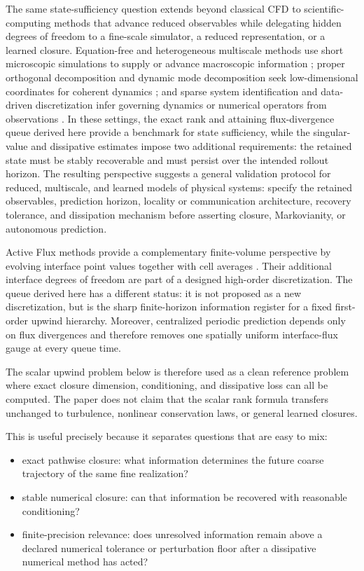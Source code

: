 \documentclass[preprint,12pt]{elsarticle}
\theoremstyle{plain}
\theoremstyle{remark}
\theoremstyle{definition}
\begin{document}
The same state-sufficiency question extends beyond classical CFD to scientific-computing
methods that advance reduced observables while delegating hidden degrees of freedom to a
fine-scale simulator, a reduced representation, or a learned closure. Equation-free and
heterogeneous multiscale methods use short microscopic simulations to supply or advance
macroscopic information \cite{kevrekidis2003,eengquist2003}; proper orthogonal
decomposition and dynamic mode decomposition seek low-dimensional coordinates for
coherent dynamics \cite{sirovich1987,schmid2010}; and sparse system identification and data-driven discretization infer governing dynamics or numerical operators from observations
\cite{brunton2016, BarSinai:2019datadriven}. In these settings, the exact rank and attaining
flux-divergence queue derived here provide a benchmark for state sufficiency, while the
singular-value and dissipative estimates impose two additional requirements: the retained
state must be stably recoverable and must persist over the intended rollout horizon. The
resulting perspective suggests a general validation protocol for reduced, multiscale, and
learned models of physical systems: specify the retained observables, prediction horizon,
locality or communication architecture, recovery tolerance, and dissipation mechanism before
asserting closure, Markovianity, or autonomous prediction.

\color{black}
Active Flux methods provide a complementary finite-volume perspective by
evolving interface point values together with cell averages
\cite{Barsukow:2019activeflux,Calhoun:2023activeflux}.  Their additional interface degrees of freedom are part of a designed high-order discretization.  The queue derived here has a different status: it is not proposed as a new discretization, but is the sharp finite-horizon information register for a fixed first-order upwind hierarchy.  Moreover, centralized
periodic prediction depends only on flux divergences and therefore removes
one spatially uniform interface-flux gauge at every queue time.

The scalar upwind problem below is therefore used as a clean reference
problem where exact closure dimension, conditioning, and dissipative loss can
all be computed.  The paper does not claim that the scalar rank formula transfers unchanged to turbulence, nonlinear conservation laws, or general learned closures.

This is useful precisely because it separates questions that are easy to
mix:
\begin{itemize}
\item exact pathwise closure: what information determines the future coarse
trajectory of the same fine realization?
\item stable numerical closure: can that information be recovered with
reasonable conditioning?
\item finite-precision relevance: does unresolved information remain above a declared numerical tolerance or perturbation floor after a dissipative numerical method has acted?
\end{itemize}
\end{document}
